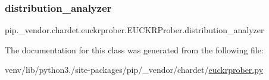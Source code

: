 \subsubsection{\texorpdfstring{distribution\+\_\+analyzer}{distribution\_analyzer}}
{\footnotesize\ttfamily pip.\+\_\+vendor.\+chardet.\+euckrprober.\+E\+U\+C\+K\+R\+Prober.\+distribution\+\_\+analyzer}



The documentation for this class was generated from the following file\+:\begin{DoxyCompactItemize}
\item 
venv/lib/python3./site-\/packages/pip/\+\_\+vendor/chardet/\hyperlink{euckrprober_8py}{euckrprober.\+py}\end{DoxyCompactItemize}
